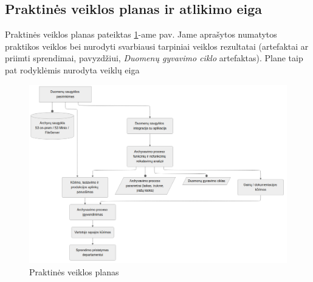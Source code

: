 \subsection*{Praktinės veiklos planas ir atlikimo eiga}

Praktinės veiklos planas pateiktas \ref{fig:plan}-ame pav. Jame aprašytos numatytos praktikos veiklos bei nurodyti svarbiausi tarpiniai veiklos rezultatai (artefaktai ar priimti sprendimai, pavyzdžiui, \textit{Duomenų gyvavimo ciklo} artefaktas). Plane taip pat rodyklėmis nurodyta veiklų eiga 

\begin{figure}
    \centering
    \includegraphics[width=\textwidth]{images/plan.png}
    \caption{Praktinės veiklos planas}
    \label{fig:plan}
\end{figure}

